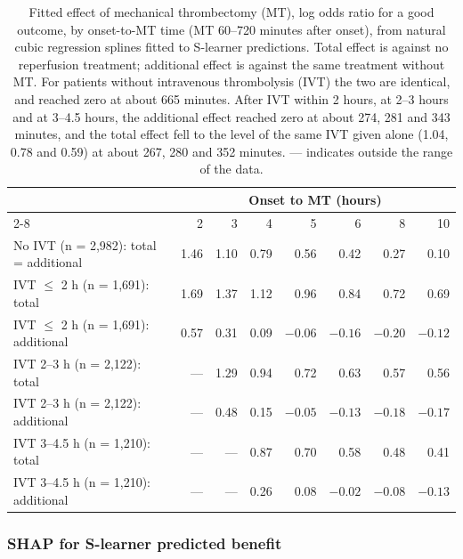 \begin{table}[htbp]
\centering
\caption{Fitted effect of mechanical thrombectomy (MT), log odds ratio for a good outcome, by onset-to-MT time (MT 60--720 minutes after onset), from natural cubic regression splines fitted to S-learner predictions. Total effect is against no reperfusion treatment; additional effect is against the same treatment without MT. For patients without intravenous thrombolysis (IVT) the two are identical, and reached zero at about 665 minutes. After IVT within 2 hours, at 2--3 hours and at 3--4.5 hours, the additional effect reached zero at about 274, 281 and 343 minutes, and the total effect fell to the level of the same IVT given alone (1.04, 0.78 and 0.59) at about 267, 280 and 352 minutes. --- indicates outside the range of the data.}
\label{tab:s_learner_mt_time_by_ivt}
\begin{tabular}{lrrrrrrr}
\toprule
 & \multicolumn{7}{c}{Onset to MT (hours)} \\
\cmidrule(lr){2-8}
 & 2 & 3 & 4 & 5 & 6 & 8 & 10 \\
\midrule
No IVT (n = 2,982): total = additional & 1.46 & 1.10 & 0.79 & 0.56 & 0.42 & 0.27 & 0.10 \\
\addlinespace
IVT $\leq$ 2 h (n = 1,691): total & 1.69 & 1.37 & 1.12 & 0.96 & 0.84 & 0.72 & 0.69 \\
IVT $\leq$ 2 h (n = 1,691): additional & 0.57 & 0.31 & 0.09 & $-0.06$ & $-0.16$ & $-0.20$ & $-0.12$ \\
\addlinespace
IVT 2--3 h (n = 2,122): total & --- & 1.29 & 0.94 & 0.72 & 0.63 & 0.57 & 0.56 \\
IVT 2--3 h (n = 2,122): additional & --- & 0.48 & 0.15 & $-0.05$ & $-0.13$ & $-0.18$ & $-0.17$ \\
\addlinespace
IVT 3--4.5 h (n = 1,210): total & --- & --- & 0.87 & 0.70 & 0.58 & 0.48 & 0.41 \\
IVT 3--4.5 h (n = 1,210): additional & --- & --- & 0.26 & 0.08 & $-0.02$ & $-0.08$ & $-0.13$ \\
\bottomrule
\end{tabular}
\end{table}






\subsubsection{SHAP for S-learner predicted benefit}\label{sec:te_sl_shap}

